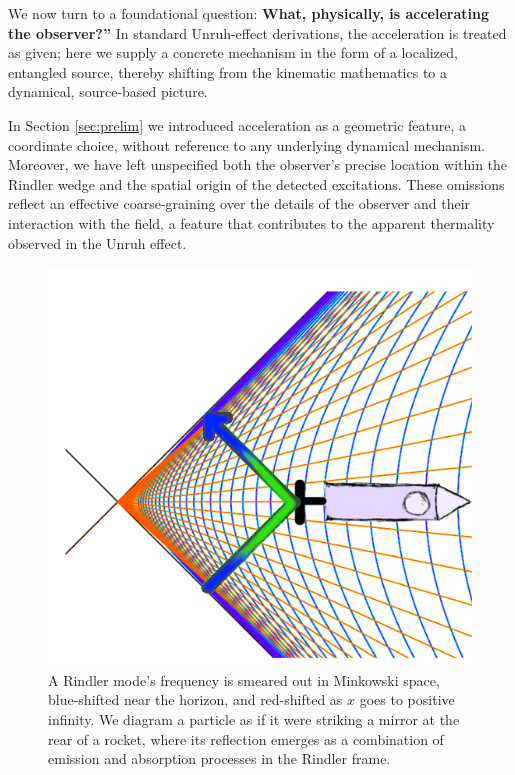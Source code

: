 \documentclass[12pt,a4paper]{article}
\begin{document}
We now turn to a foundational question: {\bf What, physically, is accelerating the observer?''} In standard Unruh-effect derivations, the acceleration is treated as given; here we supply a concrete mechanism in the form of a localized, entangled source, thereby shifting from the kinematic mathematics to a dynamical, source-based picture.

In Section \ref{sec:prelim} we introduced acceleration as a geometric feature, a coordinate choice, without reference to any underlying dynamical mechanism. Moreover, we have left unspecified both the observer’s precise location within the Rindler wedge and the spatial origin of the detected excitations. These omissions reflect an effective coarse-graining over the details of the observer and their interaction with the field, a feature that contributes to the apparent thermality observed in the Unruh effect.

\begin{figure}[h]
\centering
\includegraphics[scale=1.0]{emit_absorb.png}
\captionsetup{width=0.7\textwidth}
\caption{A Rindler mode's frequency is smeared out in Minkowski space, blue-shifted near the horizon, and red-shifted as $x$ goes to positive infinity. We diagram a particle as if it were striking a mirror at the rear of a rocket, where its reflection emerges as a combination of emission and absorption processes in the Rindler frame.}
\label{emit_absorb}
\end{figure}
\end{document}
